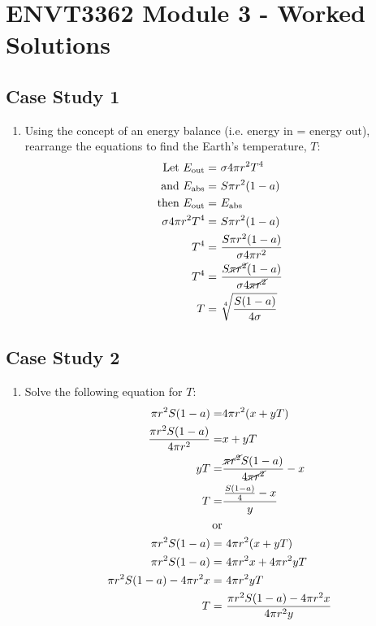 \documentclass[11pt]{article}
\begin{document}
\section*{ENVT3362 Module 3 - Worked Solutions}
\subsection*{Case Study 1}
\begin{enumerate}
	\item{Using the concept of an energy balance (i.e. energy in = energy out), rearrange the equations to find the Earth's temperature, $T$:
\begin{align*}
	\text{Let } E_{\text{out}} = &\ \sigma 4\pi r^{2} T^{4}\\
	\text{and  } E_{\text{abs}} = &\ S\pi r^{2} (1-a)\\
	\text{then }E_{\text{out}} = &\ E_{\text{abs}}\\
	\sigma 4\pi r^{2} T^{4} = &\ S\pi r^{2} (1-a) \\
	T^{4} = &\ \frac{S\pi r^{2} (1-a)}{\sigma 4\pi r^{2}}\\
	T^{4} = &\ \frac{S\cancel{\pi r^{2}} (1-a)}{\sigma 4\cancel{\pi r^{2}}}\\
	T = &\ \sqrt[4]{\frac{S (1-a)}{4\sigma}}
\end{align*}
} 
\end{enumerate}

\subsection*{Case Study 2}
\begin{enumerate}
	\item{Solve the following equation for $T$:
	\begin{align*}
	\pi r^{2} S (1-a) =& 4\pi r^{2}(x+yT)\\
	\frac{\pi r^{2} S (1-a)}{4\pi r^{2}}=& x+yT\\
	yT =& \frac{\cancel{\pi r^{2}} S (1-a)}{4\cancel{\pi r^{2}}} - x\\
	T =& \frac{\frac{S (1-a)}{4} - x}{y} \\
	\text{or}&\\
	\pi r^{2} S (1-a) =&\ 4\pi r^{2}(x+yT)\\
	\pi r^{2} S (1-a) =&\ 4\pi r^{2}x + 4\pi r^{2}yT\\
	\pi r ^{2}S(1-a) - 4\pi r^{2}x =&\ 4\pi r^{2}yT\\
	T =&\ \frac{\pi r ^{2}S(1-a) - 4\pi r^{2}x}{4\pi r^{2}y}
\end{align*}
	}
\end{enumerate}
\end{document}
